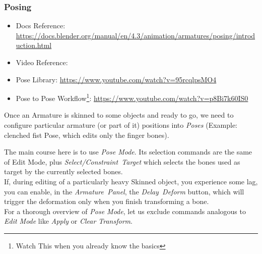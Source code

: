 \documentclass{article}
\begin{document}
\subsubsection{Posing}
\begin{itemize}[topsep=0pt, noitemsep]
    \item Docs Reference: \href{https://docs.blender.org/manual/en/4.3/animation/armatures/posing/introduction.html}{https://docs.blender.org/manual/en/4.3/animation/armatures/posing/introduction.html}
    \item Video Reference: 
    \item Pose Library: \href{https://www.youtube.com/watch?v=95rcqlpsMO4}{https://www.youtube.com/watch?v=95rcqlpsMO4}
    \item Pose to Pose Workflow\footnote{Watch This when you already know the basics}: \href{https://www.youtube.com/watch?v=p8Bi7k60IS0}{https://www.youtube.com/watch?v=p8Bi7k60IS0}
\end{itemize}
Once an Armature is skinned to some objects and ready to go, we need to configure particular armature (or part of it) positions into \textit{Poses} (Example: 
clenched fist Pose, which edits only the finger bones).\par
The main course here is to use \textit{Pose Mode}. Its selection commands are the same of Edit Mode, plus \mbox{\textit{Select/Constraint Target}} which selects the bones used as target by the currently
selected bones.\\
If, during editing of a particularly heavy Skinned object, you experience some lag, you can enable, in the \mbox{\textit{Armature Panel}}, the \mbox{\textit{Delay Deform}} button, which will trigger the 
deformation only when you finish transforming a bone.\\
For a thorough overview of \textit{Pose Mode}, let us exclude commands analogous to \textit{Edit Mode} like \textit{Apply} or \textit{Clear Transform}.
\end{document}
